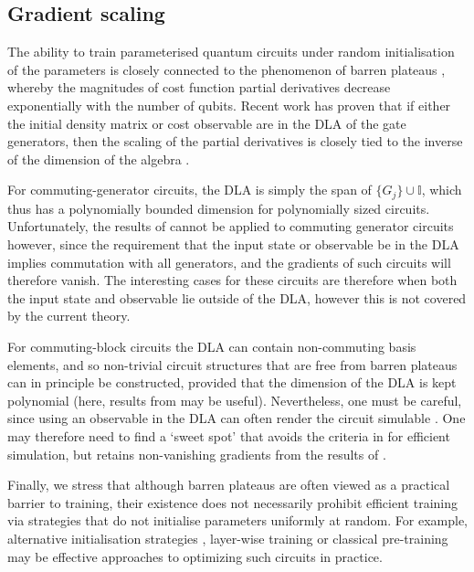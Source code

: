 \documentclass[a4paper,twocolumn,11pt,accepted=2025-09-06]{quantumarticle}
\begin{document}
\subsection{Gradient scaling}
The ability to train parameterised quantum circuits under random initialisation of the parameters is closely connected to the phenomenon of barren plateaus \cite{mcclean2018barren}, whereby the magnitudes of cost function partial derivatives decrease exponentially with the number of qubits. Recent work has proven that if either the initial density matrix or cost observable are in the DLA of the gate generators, then the scaling of the partial derivatives is closely tied to the inverse of the dimension of the algebra \cite{ragoneunified, fontanaadjoint}. 

For commuting-generator circuits, the DLA is simply the span of $\{G_j\}\cup \mathbb{I}$, which thus has a polynomially bounded dimension for polynomially sized circuits. Unfortunately, the results of \cite{ragoneunified, fontanaadjoint} cannot be applied to commuting generator circuits however, since the requirement that the input state or observable be in the DLA implies commutation with all generators, and the gradients of such circuits will therefore vanish. The interesting cases for these circuits are therefore when both the input state and observable lie outside of the DLA, however this is not covered by the current theory. 

For commuting-block circuits the DLA can contain non-commuting basis elements, and so non-trivial circuit structures that are free from barren plateaus can in principle be constructed, provided that the dimension of the DLA is kept polynomial (here, results from \cite{wiersema2023classification} may be useful). Nevertheless, one must be careful, since using an observable in the DLA can often render the circuit simulable \cite{goh2023}. One may therefore need to find a `sweet spot' that avoids the criteria in \cite{goh2023} for efficient simulation, but retains non-vanishing gradients from the results of \cite{ragoneunified, fontanaadjoint}. 

Finally, we stress that although barren plateaus are often viewed as a practical barrier to training, their existence does not necessarily prohibit efficient training via strategies that do not initialise parameters uniformly at random. For example, alternative initialisation strategies \cite{grant2019, sack2022, zhang2022, volkoff2021}, layer-wise training \cite{skolik2021} or classical pre-training \cite{rudolph2023, simon2023} may be effective approaches to optimizing such circuits in practice. 
\end{document}
